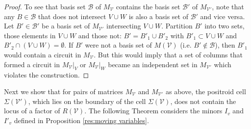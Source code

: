 \documentclass[11pt]{article}
\newcommand{\cV}{\mathcal{V}}
\newcommand{\cB}{\mathcal{B}}
\newcommand{\Rows}{\textrm{Row}}
\theoremstyle{remark}
\theoremstyle{definition}
\begin{document}
\begin{proof}
\begin{comment}
\emph{Proof of claim:} Suppose, for contradiction, $I_j = I'_j$. Write $I_j = v_1 \ldots v_k$ with $v_i <_j v_{i+1}$. By definition fo the Grassmann necklace, $a$ is the first column in the $>_j$ ordering of the columns of $C$ that is not contained in the flat defined by previous elements of $I_j$: $\textrm{cl}(\{v_i | v_i <_j a \})$ in $M(C)$. In $C'$, the non-zero entries in the column $a$ lie in the rows where $V$ has non-zero entries: $\Rows(a) \subset \Rows(V)$. Since $a \in I'_j$, the flat $V \cup W$ in $M(C')$ is not contained in the the flat defined by the previous elements of $I'_j$: $V \cup W \not \subset \textrm{cl}(\{v_i | v_i <_j a )$ in $M(C')$. Since $\Rows(V \cup W)$ in $C'$ is the same as $\Rows(V)$ in $C$, the flat defined by $V$ in $M(C)$ is is not contained in the the flat defined by the previous elements of $I_j$: $V\not \subset \textrm{cl}(\{v_i | v_i <_j a ) \}$ in $M(C)$. \todo{is $U$ uniquely defined?} Let $U \subset I_j$ be the smallest subset of $I_j$ that is needed to ensure that $V \subset \textrm{cl}(\{v_i | v_i <_j a \} \cup U)$ in $M(C)$. Note that $a$ preceeds all elements of $U$, by construction s $a \leq_j u$ for all $u \in U$ in $M(C)$. However, also by construction, $a \in U$ in $M(C')$. Therefore, there must be some $b \in U$ that is in $M(C)$ but not in $M(C')$, thus violating $I_j = I'_j$.
\end{comment} 

To see that basis set $\cB$ of $M_\cV$ contains the basis set $\cB'$ of $M_{\cV'}$, note that any $B \in \cB$ that does not intersect $V \cup W$ is also a basis set of $\cB'$ and vice versa. Let $B' \in \cB'$ be a basis set of $M_{\cV'}$ intersecting $V\cup W$. Partition $B'$ into two sets, those elements in $V \cup W$  and those not: $B' = B'_1 \cup B'_2$ with $B'_1 \subset V \cup W$ and $B'_2 \cap (V \cup W) = \emptyset$. If $B'$ were not a basis set of $M(\cV)$ (i.e. $B' \not \in \cB$), then $B'_1$ would contain a circuit in $M_\cV$. But this would imply that a set of columns that formed a circuit in $M_{\cV}|_V$ or $M_\cV|_W$ became an independent set in $M_{\cV'}$ which violates the construction.
\end{proof}

Next we show that for pairs of matrices $M_{\cV}$ and $M_{\cV'}$ as above, the positroid cell $\Sigma(\cV')$, which lies on the boundary of the cell $\Sigma(\cV)$, does not contain the locus of a factor of $R(\cV)$. The following Theorem considers the minors $I_v$ and $I'_v$ defined in Proposition \ref{res:moving variables}. 
\end{document}
